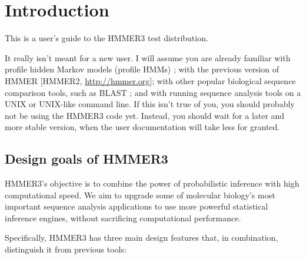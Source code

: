 \section{Introduction}
\setcounter{footnote}{0}

This is a user's guide to the HMMER3 test distribution. 

It really isn't meant for a new user. I will assume you are already
familiar with profile hidden Markov models (profile HMMs)
\citep{Krogh94,Eddy98,Durbin98}; with the previous version of HMMER
[HMMER2, \url{http://hmmer.org}]; with other popular biological
sequence comparison tools, such as BLAST \citep{Altschul97}; and with
running sequence analysis tools on a UNIX or UNIX-like command
line. If this isn't true of you, you should probably not be using the
HMMER3 code yet. Instead, you should wait for a later and more stable
version, when the user documentation will take less for granted.

\subsection{Design goals of HMMER3}

HMMER3's objective is to combine the power of probabilistic inference
with high computational speed. We aim to upgrade some of molecular
biology's most important sequence analysis applications to use more
powerful statistical inference engines, without sacrificing
computational performance.

Specifically, HMMER3 has three main design features that, in
combination, distinguish it from previous tools:

